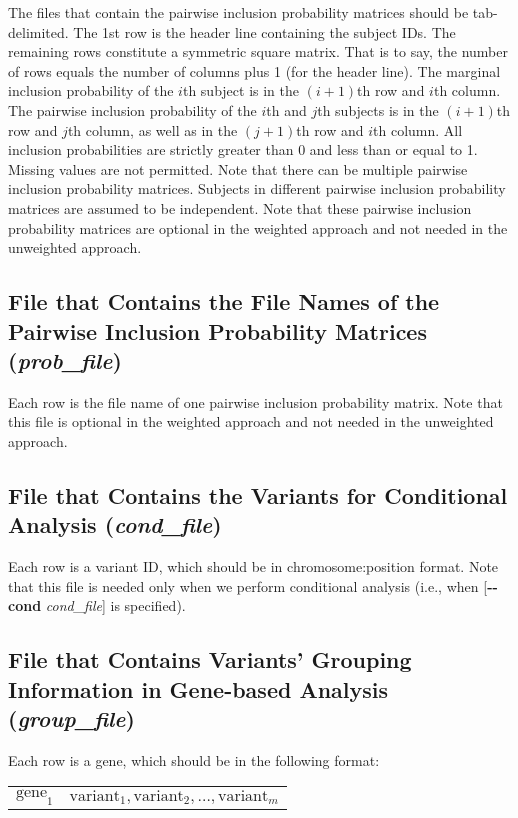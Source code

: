 \documentclass[12pt,letter]{article}
\begin{document}
The files that contain the pairwise inclusion probability matrices should be tab-delimited. The 1st row is the header line containing the subject IDs. 
The remaining rows constitute a symmetric square matrix. That is to say, 
the number of rows equals the number of columns plus 1 (for the header line). 
The marginal inclusion probability of the $i$th subject is in the $(i+1)$th row and $i$th column. 
The pairwise inclusion probability of the $i$th and $j$th subjects is in the $(i+1)$th row and $j$th 
column, as well as in the $(j+1)$th row and $i$th column. 
All inclusion probabilities are strictly greater than 0 and less than or equal to 1. 
Missing values are not permitted. 
Note that there can be multiple pairwise inclusion probability matrices.
Subjects in different pairwise inclusion probability matrices are assumed to be 
independent. Note that these pairwise inclusion probability matrices are optional
in the weighted approach and not needed
in the unweighted approach.

\subsection{File that Contains the File Names of the Pairwise Inclusion Probability Matrices ({\it prob\_file})} 

Each row is the file name of one pairwise inclusion probability matrix. Note that this file is 
optional in the weighted approach and not needed
in the unweighted approach.

\subsection{File that Contains the Variants for Conditional Analysis ({\it cond\_file})}

Each row is a variant ID, which should be in {\ttfamily chromosome:position} format. Note that this file is needed
only when we perform conditional analysis (i.e., when [{\bf -{}-cond} {\it cond\_file}] is specified).

\subsection{File that Contains Variants' Grouping Information in Gene-based Analysis ({\it group\_file})}

Each row is a gene, which should be in the following format:

{\ttfamily
\begin{center}
\begin{tabular}{rr} 
$\text{gene}_1$ & $\text{variant}_1,\text{variant}_2,\dotsc,\text{variant}_m$
\end{tabular}
\end{center}}
 
\end{document}
